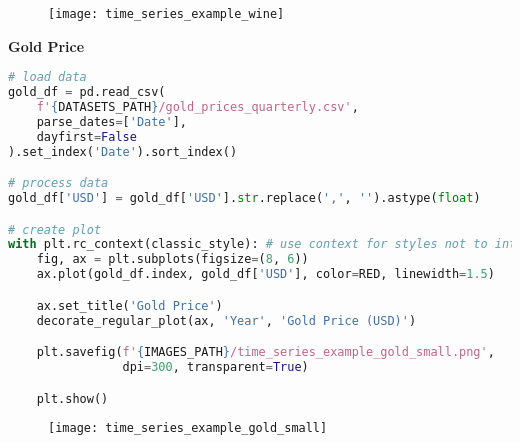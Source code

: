 \begin{figure}[h!]
  \centering
  \texttt{[image: time\_series\_example\_wine]}
\end{figure}\newpage


{\noindent\hspace{-12.5pt}\normalsize\bfseries Gold Price}\vspace{-10pt}
\begin{center}
  \begin{lstlisting}[language=Python, 
  caption={Стоимость золота в долларах.}, 
  label={lst:time_series_example_gold_small}]
# load data
gold_df = pd.read_csv(
    f'{DATASETS_PATH}/gold_prices_quarterly.csv',
    parse_dates=['Date'],
    dayfirst=False
).set_index('Date').sort_index()

# process data
gold_df['USD'] = gold_df['USD'].str.replace(',', '').astype(float)

# create plot
with plt.rc_context(classic_style): # use context for styles not to interfere
    fig, ax = plt.subplots(figsize=(8, 6))
    ax.plot(gold_df.index, gold_df['USD'], color=RED, linewidth=1.5)

    ax.set_title('Gold Price')
    decorate_regular_plot(ax, 'Year', 'Gold Price (USD)')

    plt.savefig(f'{IMAGES_PATH}/time_series_example_gold_small.png', 
                dpi=300, transparent=True)

    plt.show()
  \end{lstlisting}
\end{center}

\begin{figure}[h!]
  \centering
  \texttt{[image: time\_series\_example\_gold\_small]}
\end{figure}\newpage


